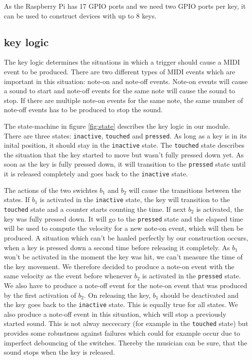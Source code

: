 \documentclass[paper=a4,fontsize=11pt,twocolumn,pagesize,bibtotoc]{scrartcl}
\begin{document}
As the Raspberry Pi has 17 GPIO ports and we need two GPIO ports per key, it can be used to construct devices with up to 8 keys.

\subsection{key logic}
The key logic determines the situations in which a trigger should cause a MIDI event to be produced. There are two different types of MIDI events which are important in this situation: note-on and note-off events. Note-on events will cause a sound to start and note-off events for the same note will cause the sound to stop. If there are multiple note-on events for the same note, the same number of note-off events has to be produced to stop the sound.

The state-machine in figure \ref{fig:state} describes the key logic in our module. There are three states: \texttt{inactive}, \texttt{touched} and \texttt{pressed}. As long as a key is in its inital position, it should stay in the \texttt{inactive} state. The \texttt{touched} state describes the situation that the key started to move but wasn't fully pressed down yet. As soon as the key is fully pressed down, it will transition to the \texttt{pressed} state until it is released completely and goes back to the \texttt{inactive} state.

The actions of the two swichtes $b_1$ and $b_2$ will cause the transitions between the states. If $b_1$ is activated in the \texttt{inactive} state, the key will transition to the \texttt{touched} state and a counter starts counting the time. If next $b_2$ is activated, the key was fully pressed down. It will go to the \texttt{pressed} state and the elapsed time will be used to compute the velocity for a new note-on event, which will then be produced. A situation which can't be hanled perfectly by our construction occurs, when a key is pressed down a second time before releasing it completely. As $b_1$ won't be activated in the moment the key was hit, we can't measure the time of the key movement. We therefore decided to produce a note-on event with the same velocity as the event before whenever $b_2$ is activated in the \texttt{pressed} state. We also have to produce a note-off event for the note-on event that was produced by the first activation of $b_2$. On releasing the key, $b_1$ should be deactivated and the key goes back to the \texttt{inactive} state. This is equally true for all states. We also produce a note-off event in this situation, which will stop a previously started sound. This is not alway neccecary (for example in the \texttt{touched} state) but provides some robustness against failures which could for example occur due to imperfect debouncing of the switches. Thereby the musician can be sure, that the sound stops when the key is released.
\end{document}
